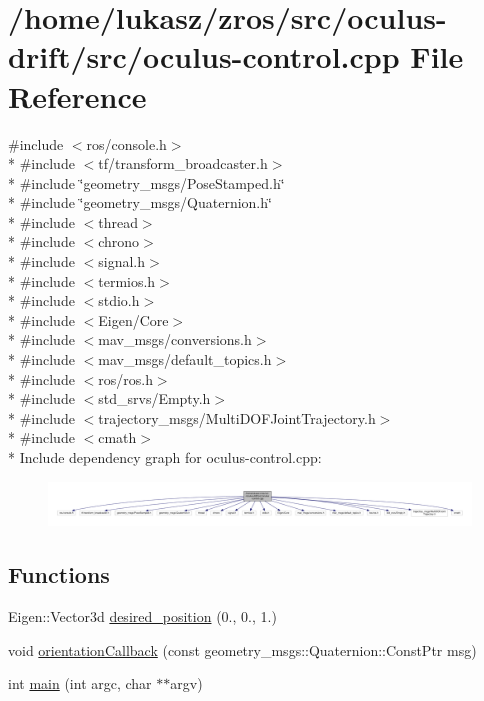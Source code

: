 \hypertarget{oculus-control_8cpp}{}\section{/home/lukasz/zros/src/oculus-\/drift/src/oculus-\/control.cpp File Reference}
\label{oculus-control_8cpp}
{\ttfamily \#include $<$ros/console.\+h$>$}\\*
{\ttfamily \#include $<$tf/transform\+\_\+broadcaster.\+h$>$}\\*
{\ttfamily \#include \char`\"{}geometry\+\_\+msgs/\+Pose\+Stamped.\+h\char`\"{}}\\*
{\ttfamily \#include \char`\"{}geometry\+\_\+msgs/\+Quaternion.\+h\char`\"{}}\\*
{\ttfamily \#include $<$thread$>$}\\*
{\ttfamily \#include $<$chrono$>$}\\*
{\ttfamily \#include $<$signal.\+h$>$}\\*
{\ttfamily \#include $<$termios.\+h$>$}\\*
{\ttfamily \#include $<$stdio.\+h$>$}\\*
{\ttfamily \#include $<$Eigen/\+Core$>$}\\*
{\ttfamily \#include $<$mav\+\_\+msgs/conversions.\+h$>$}\\*
{\ttfamily \#include $<$mav\+\_\+msgs/default\+\_\+topics.\+h$>$}\\*
{\ttfamily \#include $<$ros/ros.\+h$>$}\\*
{\ttfamily \#include $<$std\+\_\+srvs/\+Empty.\+h$>$}\\*
{\ttfamily \#include $<$trajectory\+\_\+msgs/\+Multi\+D\+O\+F\+Joint\+Trajectory.\+h$>$}\\*
{\ttfamily \#include $<$cmath$>$}\\*
Include dependency graph for oculus-\/control.cpp\+:\nopagebreak
\begin{figure}[H]
\begin{center}
\leavevmode
\includegraphics[width=350pt]{oculus-control_8cpp__incl}
\end{center}
\end{figure}
\subsection*{Functions}
\begin{DoxyCompactItemize}
\item 
Eigen\+::\+Vector3d \hyperlink{oculus-control_8cpp_a608d9948c063034b7605598daaeccc3e}{desired\+\_\+position} (0., 0., 1.)
\item 
void \hyperlink{oculus-control_8cpp_a570d60ef77ebe021853fd13c864ab969}{orientation\+Callback} (const geometry\+\_\+msgs\+::\+Quaternion\+::\+Const\+Ptr msg)
\item 
int \hyperlink{oculus-control_8cpp_a3c04138a5bfe5d72780bb7e82a18e627}{main} (int argc, char $\ast$$\ast$argv)
\end{DoxyCompactItemize}
